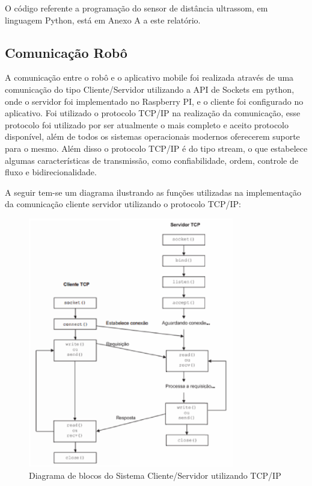 O código referente a programação do sensor de distância ultrassom, em linguagem Python, está em Anexo A a este relatório.

\subsection{Comunicação Robô}

A comunicação entre o robô e o aplicativo mobile foi realizada através de uma comunicação do tipo Cliente/Servidor utilizando a API de Sockets em python, onde o servidor foi implementado no Raspberry PI, e o cliente foi configurado no aplicativo. Foi utilizado o protocolo TCP/IP na realização da comunicação, esse protocolo foi utilizado por ser atualmente o mais completo e aceito protocolo disponível, além de todos os sistemas operacionais modernos oferecerem suporte para o mesmo. Além disso o protocolo TCP/IP é do tipo stream, o que estabelece algumas características de transmissão, como confiabilidade, ordem, controle de fluxo e bidirecionalidade.

A seguir tem-se um diagrama ilustrando as funções utilizadas na implementação da comunicação cliente servidor utilizando o protocolo TCP/IP:

\begin{figure}[H]
    \centering
    \includegraphics[width=0.8\textwidth]{figuras/diagrama_socket.eps}
    \caption{Diagrama de blocos do Sistema Cliente/Servidor utilizando TCP/IP}
    \label{fig:catia01}
\end{figure}

